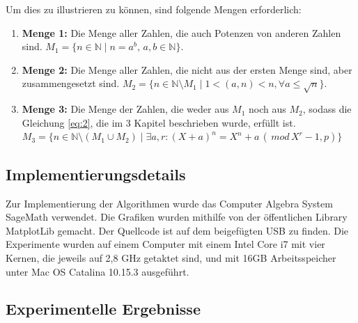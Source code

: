 \documentclass[12pt,oneside]{article}
\theoremstyle{remark}
\theoremstyle{definition}
\begin{document}
Um dies zu illustrieren zu können, sind folgende Mengen erforderlich:
\begin{enumerate}
    \item \textbf{Menge 1:} Die Menge aller Zahlen, die auch Potenzen von anderen Zahlen sind. $M_1 = \{ n \in \mathbb{N} \mid n = a^b, \, a,b \in \mathbb{N}\}$.\newline
    
    \item \textbf{Menge 2:} Die Menge aller Zahlen, die nicht aus der ersten Menge sind, aber zusammengesetzt sind. $M_2 = \{ n \in \mathbb{N}\setminus	 M_1 \mid 1 < (a,n) < n, \forall a \leq \sqrt{n} \}$.\newline
    
    \item \textbf{Menge 3:} Die Menge der Zahlen, die weder aus $M_1$ noch aus $M_2$, sodass die Gleichung \ref{eq:2}, die im 3 Kapitel beschrieben wurde, erfüllt ist. $M_3 = \{ n \in \mathbb{N} \setminus (M_1 \cup M_2) \mid \exists a,r : (X + a)^n = X^n + a \, (\, mod \, X^r - 1,p) \}$
\end{enumerate}


\subsection{Implementierungsdetails}
Zur Implementierung der Algorithmen wurde das Computer Algebra System SageMath verwendet. Die Grafiken wurden mithilfe von der öffentlichen Library MatplotLib gemacht. Der Quellcode ist auf dem beigefügten USB zu finden. Die Experimente wurden auf einem Computer mit einem Intel Core i7 mit vier Kernen, die jeweils auf 2,8 GHz getaktet sind, und mit 16GB Arbeitsspeicher unter Mac OS Catalina 10.15.3 ausgeführt.

\subsection{Experimentelle Ergebnisse}
\end{document}
